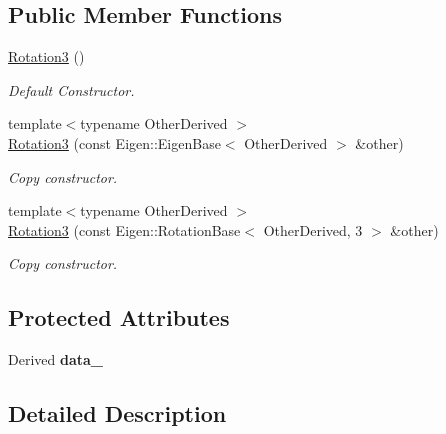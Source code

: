 \subsection*{Public Member Functions}
\begin{DoxyCompactItemize}
\item 
\hyperlink{classow__core_1_1Rotation3_abd12cb236cf8ff6e5337228633d4815b}{Rotation3} ()\hypertarget{classow__core_1_1Rotation3_abd12cb236cf8ff6e5337228633d4815b}{}\label{classow__core_1_1Rotation3_abd12cb236cf8ff6e5337228633d4815b}

\begin{DoxyCompactList}\small\item\em Default Constructor. \end{DoxyCompactList}\item 
{\footnotesize template$<$typename Other\+Derived $>$ }\\\hyperlink{classow__core_1_1Rotation3_af8f7c2fd09be7d4e7be68c6786114fab}{Rotation3} (const Eigen\+::\+Eigen\+Base$<$ Other\+Derived $>$ \&other)
\begin{DoxyCompactList}\small\item\em Copy constructor. \end{DoxyCompactList}\item 
{\footnotesize template$<$typename Other\+Derived $>$ }\\\hyperlink{classow__core_1_1Rotation3_a34cd49f675144ebc5c6cd50adbd18319}{Rotation3} (const Eigen\+::\+Rotation\+Base$<$ Other\+Derived, 3 $>$ \&other)
\begin{DoxyCompactList}\small\item\em Copy constructor. \end{DoxyCompactList}\end{DoxyCompactItemize}
\subsection*{Protected Attributes}
\begin{DoxyCompactItemize}
\item 
Derived {\bfseries data\+\_\+}\hypertarget{classow__core_1_1Rotation3_a815b7076eb7e0ed4f927cc1668393b7b}{}\label{classow__core_1_1Rotation3_a815b7076eb7e0ed4f927cc1668393b7b}

\end{DoxyCompactItemize}


\subsection{Detailed Description}
